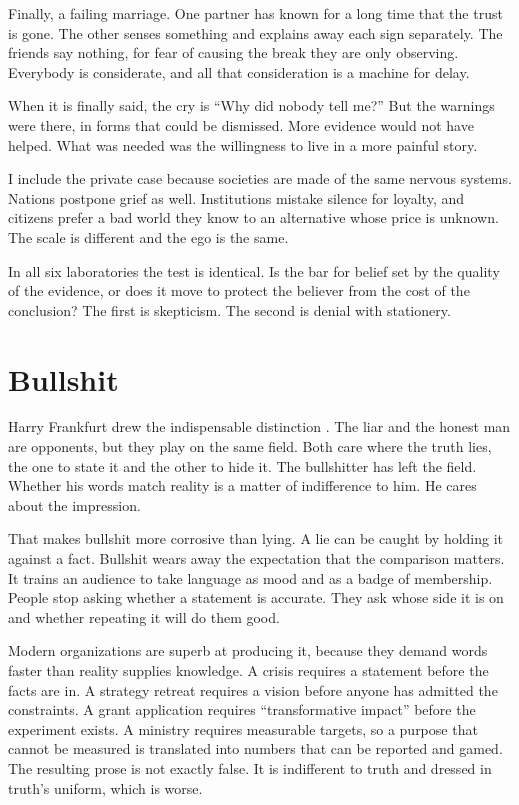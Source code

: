 \documentclass[12pt,a4paper]{book}
\begin{document}
Finally, a failing marriage. One partner has known for a long time that the trust is gone. The other senses something and explains away each sign separately. The friends say nothing, for fear of causing the break they are only observing. Everybody is considerate, and all that consideration is a machine for delay.

When it is finally said, the cry is ``Why did nobody tell me?'' But the warnings were there, in forms that could be dismissed. More evidence would not have helped. What was needed was the willingness to live in a more painful story.

I include the private case because societies are made of the same nervous systems. Nations postpone grief as well. Institutions mistake silence for loyalty, and citizens prefer a bad world they know to an alternative whose price is unknown. The scale is different and the ego is the same.

In all six laboratories the test is identical. Is the bar for belief set by the quality of the evidence, or does it move to protect the believer from the cost of the conclusion? The first is skepticism. The second is denial with stationery.

\section{Bullshit}

Harry Frankfurt drew the indispensable distinction \cite{Frankfurt-OnBullshit}. The liar and the honest man are opponents, but they play on the same field. Both care where the truth lies, the one to state it and the other to hide it. The bullshitter has left the field. Whether his words match reality is a matter of indifference to him. He cares about the impression.

That makes bullshit more corrosive than lying. A lie can be caught by holding it against a fact. Bullshit wears away the expectation that the comparison matters. It trains an audience to take language as mood and as a badge of membership. People stop asking whether a statement is accurate. They ask whose side it is on and whether repeating it will do them good.

Modern organizations are superb at producing it, because they demand words faster than reality supplies knowledge. A crisis requires a statement before the facts are in. A strategy retreat requires a vision before anyone has admitted the constraints. A grant application requires ``transformative impact'' before the experiment exists. A ministry requires measurable targets, so a purpose that cannot be measured is translated into numbers that can be reported and gamed. The resulting prose is not exactly false. It is indifferent to truth and dressed in truth's uniform, which is worse.
\end{document}
